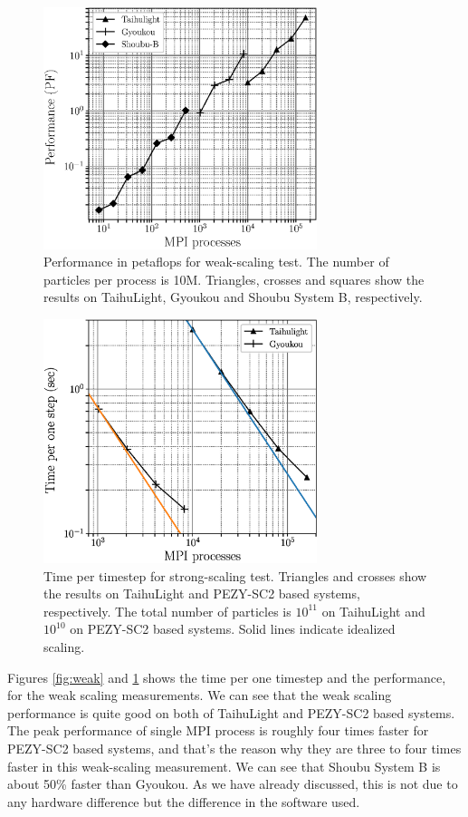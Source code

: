 \documentclass[Afour,sageh,times]{sagej}
\begin{document}
\begin{figure}
  \centering
  \includegraphics[width=8cm, clip]{./fig/weak_scaling_speed.eps}
  \caption{Performance in petaflops for weak-scaling test.  The number of
    particles per process is 10M. Triangles, crosses and squares show the
    results on TaihuLight, Gyoukou and Shoubu System B, respectively.}
  \label{fig:weakpf}
\end{figure}

\begin{figure}
  \centering
  \includegraphics[width=8cm, clip]{./fig/strong_scaling.eps}
  \caption{Time per timestep for strong-scaling test.  Triangles and
    crosses show the results on TaihuLight and PEZY-SC2 based systems,
    respectively. The total number of particles is $10^{11}$ on
    TaihuLight and $10^{10}$ on PEZY-SC2 based systems. Solid lines
    indicate idealized scaling.}
  \label{fig:strong}
\end{figure}


Figures \ref{fig:weak} and \ref{fig:weakpf} shows the time per one
timestep and the performance, for the weak scaling measurements. We
can see that the weak scaling performance is quite good on both of
TaihuLight and PEZY-SC2 based systems. The peak performance of single
MPI process is roughly four times faster for PEZY-SC2 based systems,
and that's the reason why they are three to four times faster in this
weak-scaling measurement. We can see that Shoubu System B is about
50\% faster than Gyoukou. As we have already discussed, this is not
due to any hardware difference but the difference in the software
used.
\end{document}
